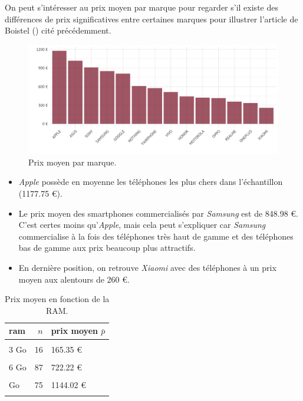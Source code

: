 \documentclass[
  12pt,
]{report}
\begin{document}
On peut s'intéresser au prix moyen par marque pour regarder s'il existe
des différences de prix significatives entre certaines marques pour
illustrer l'article de Boistel () cité
précédemment.

\begin{figure}[H]

{\centering \includegraphics{report_files/figure-pdf/fig_mean_price-1.pdf}

}

\caption{Prix moyen par marque.}

\end{figure}%

\begin{itemize}
\item
  \emph{Apple} possède en moyenne les téléphones les plus chers dans
  l'échantillon (1177.75 €).
\item
  Le prix moyen des smartphones commercialisés par \emph{Samsung} est de
  848.98 €. C'est certes moins qu'\emph{Apple}, mais cela peut
  s'expliquer car \emph{Samsung} commercialise à la fois des téléphones
  très haut de gamme et des téléphones bas de gamme aux prix beaucoup
  plus attractifs.
\item
  En dernière position, on retrouve \emph{Xiaomi} avec des téléphones à
  un prix moyen aux alentours de 260 €.
\end{itemize}

\newpage

\begin{table}[!h]
\centering
\caption{\label{tab:kable_1}Prix moyen en fonction de la RAM.}
\centering
\begin{tabular}[t]{lrl}
\toprule
\textbf{ram} & \textbf{$n$} & \textbf{prix moyen $\bar p$}\\
\midrule
\cellcolor{gray!10}{2 Go} & \cellcolor{gray!10}{21} & \cellcolor{gray!10}{110.11 €}\\
3 Go & 16 & 165.35 €\\
\cellcolor{gray!10}{4 Go} & \cellcolor{gray!10}{118} & \cellcolor{gray!10}{413.4 €}\\
6 Go & 87 & 722.22 €\\
\cellcolor{gray!10}{8 Go} & \cellcolor{gray!10}{163} & \cellcolor{gray!10}{835.55 €}\\
\addlinespace
12 Go & 75 & 1144.02 €\\
\cellcolor{gray!10}{16 Go} & \cellcolor{gray!10}{7} & \cellcolor{gray!10}{1106.14 €}\\
\bottomrule
\end{tabular}
\end{table}
\end{document}
